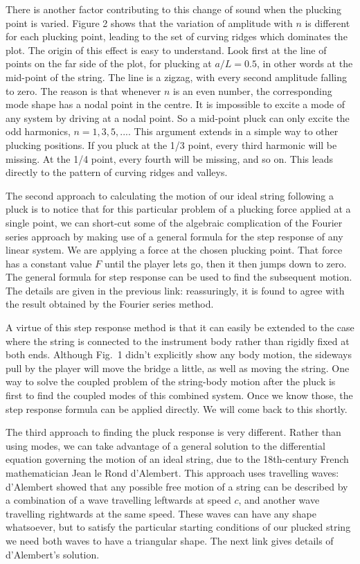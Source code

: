   There is another factor contributing to this change of sound when the 
  plucking point is varied. Figure 2 shows that the variation of amplitude with 
  $n$ is different for each plucking point, leading to the set of curving 
  ridges which dominates the plot. The origin of this effect is easy to 
  understand. Look first at the line of points on the far side of the plot, for 
  plucking at $a/L=0.5$, in other words at the mid-point of the string. The 
  line is a zigzag, with every second amplitude falling to zero. The reason is 
  that whenever $n$ is an even number, the corresponding mode shape has a nodal 
  point in the centre. It is impossible to excite a mode of any system by 
  driving at a nodal point. So a mid-point pluck can only excite the odd 
  harmonics, $n=1,3,5,...$. This argument extends in a simple way to other 
  plucking positions. If you pluck at the 1/3 point, every third harmonic will 
  be missing. At the 1/4 point, every fourth will be missing, and so on. This 
  leads directly to the pattern of curving ridges and valleys. 

  The second approach to calculating the motion of our ideal string following a 
  pluck is to notice that for this particular problem of a plucking force 
  applied at a single point, we can short-cut some of the algebraic 
  complication of the Fourier series approach by making use of a general 
  formula for the step response of any linear system. We are applying a force 
  at the chosen plucking point. That force has a constant value $F$ until the 
  player lets go, then it then jumps down to zero. The general formula for step 
  response can be used to find the subsequent motion. The details are given in 
  the previous link: reassuringly, it is found to agree with the result 
  obtained by the Fourier series method. 

  A virtue of this step response method is that it can easily be extended to 
  the case where the string is connected to the instrument body rather than 
  rigidly fixed at both ends. Although Fig.\ 1 didn't explicitly show any body 
  motion, the sideways pull by the player will move the bridge a little, as 
  well as moving the string. One way to solve the coupled problem of the 
  string-body motion after the pluck is first to find the coupled modes of this 
  combined system. Once we know those, the step response formula can be applied 
  directly. We will come back to this shortly. 

  The third approach to finding the pluck response is very different. Rather 
  than using modes, we can take advantage of a general solution to the 
  differential equation governing the motion of an ideal string, due to the 
  18th-century French mathematician Jean le Rond d'Alembert. This approach uses 
  travelling waves: d'Alembert showed that any possible free motion of a string 
  can be described by a combination of a wave travelling leftwards at speed 
  $c$, and another wave travelling rightwards at the same speed. These waves 
  can have any shape whatsoever, but to satisfy the particular starting 
  conditions of our plucked string we need both waves to have a triangular 
  shape. The next link gives details of d'Alembert's solution. 

